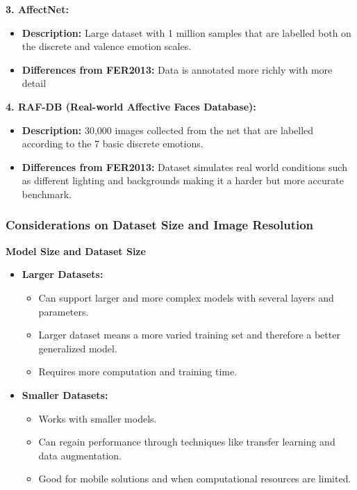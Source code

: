 \documentclass{article}
\begin{document}
\textbf{3. AffectNet:}
\begin{itemize}
    \item \textbf{Description:} Large dataset with 1 million samples that are labelled both on the discrete and valence emotion scales.
    \item \textbf{Differences from FER2013:} Data is annotated more richly with more detail
\end{itemize}

\textbf{4. RAF-DB (Real-world Affective Faces Database):}
\begin{itemize}
    \item \textbf{Description:} 30,000 images collected from the net that are labelled according to the 7 basic discrete emotions.
    \item \textbf{Differences from FER2013:} Dataset simulates real world conditions such as different lighting and backgrounds making it a harder but more accurate benchmark.
\end{itemize}

\subsubsection*{Considerations on Dataset Size and Image Resolution}

\textbf{Model Size and Dataset Size}

\begin{itemize}
    \item \textbf{Larger Datasets:} 
    \begin{itemize}
        \item Can support larger and more complex models with several layers and parameters.
        \item Larger dataset means a more varied training set and therefore a better generalized model.
        \item Requires more computation and training time.
    \end{itemize}
    \item \textbf{Smaller Datasets:}
    \begin{itemize}
        \item Works with smaller models.
        \item Can regain performance through techniques like transfer learning and data augmentation.
        \item Good for mobile solutions and when computational resources are limited.
    \end{itemize}
\end{itemize}
\end{document}
